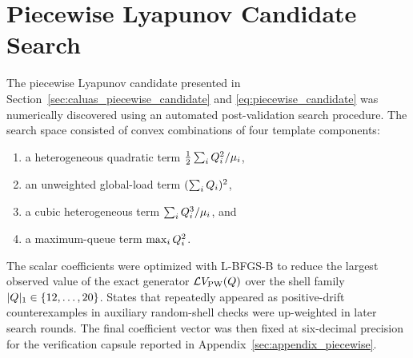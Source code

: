\section{Piecewise Lyapunov Candidate Search}
\label{sec:appendix_piecewise_search}

The piecewise Lyapunov candidate presented in Section~\ref{sec:caluas_piecewise_candidate} and \cref{eq:piecewise_candidate} was numerically discovered using an automated post-validation search procedure. The search space consisted of convex combinations of four template components:
\begin{enumerate}
\item a heterogeneous quadratic term $\frac{1}{2}\sum_i Q_{i}^2 / \mu_i$,
\item an unweighted global-load term $(\sum_i Q_{i})^2$,
\item a cubic heterogeneous term $\sum_i Q_{i}^3 / \mu_i$, and
\item a maximum-queue term $\max_i Q_{i}^2$.
\end{enumerate}

The scalar coefficients were optimized with L-BFGS-B to reduce the largest observed value of the exact generator $\mathcal{L} V_{\mathrm{PW}}(Q)$ over the shell family $|Q|_1 \in \{12, \dots, 20\}$. States that repeatedly appeared as positive-drift counterexamples in auxiliary random-shell checks were up-weighted in later search rounds. The final coefficient vector was then fixed at six-decimal precision for the verification capsule reported in Appendix~\ref{sec:appendix_piecewise}.
